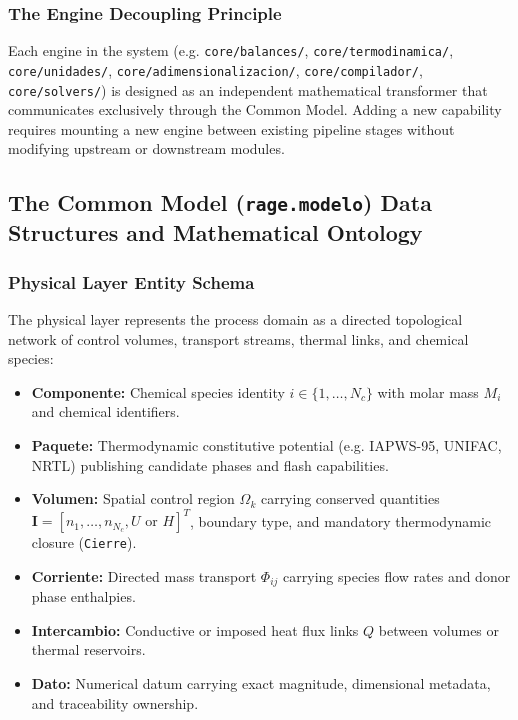 \documentclass[11pt,a4paper]{article}
\begin{document}
\subsubsection{The Engine Decoupling Principle}
Each engine in the system (e.g. \texttt{core/balances/}, \texttt{core/termodinamica/}, \texttt{core/unidades/}, \texttt{core/adimensionalizacion/}, \texttt{core/compilador/}, \texttt{core/solvers/}) is designed as an independent mathematical transformer that communicates exclusively through the Common Model. Adding a new capability requires mounting a new engine between existing pipeline stages without modifying upstream or downstream modules.

\subsection{The Common Model (\texttt{rage.modelo}) Data Structures and Mathematical Ontology}
\label{subsec:common-model-ontology}

\subsubsection{Physical Layer Entity Schema}
The physical layer represents the process domain as a directed topological network of control volumes, transport streams, thermal links, and chemical species:
\begin{itemize}[leftmargin=*]
    \item \textbf{Componente:} Chemical species identity $i \in \{1, \dots, N_c\}$ with molar mass $M_i$ and chemical identifiers.
    \item \textbf{Paquete:} Thermodynamic constitutive potential (e.g. IAPWS-95, UNIFAC, NRTL) publishing candidate phases and flash capabilities.
    \item \textbf{Volumen:} Spatial control region $\Omega_k$ carrying conserved quantities $\mathbf{I} = [n_1, \dots, n_{N_c}, U \text{ or } H]^T$, boundary type, and mandatory thermodynamic closure (\texttt{Cierre}).
    \item \textbf{Corriente:} Directed mass transport $\Phi_{ij}$ carrying species flow rates and donor phase enthalpies.
    \item \textbf{Intercambio:} Conductive or imposed heat flux links $Q$ between volumes or thermal reservoirs.
    \item \textbf{Dato:} Numerical datum carrying exact magnitude, dimensional metadata, and traceability ownership.
\end{itemize}
\end{document}
